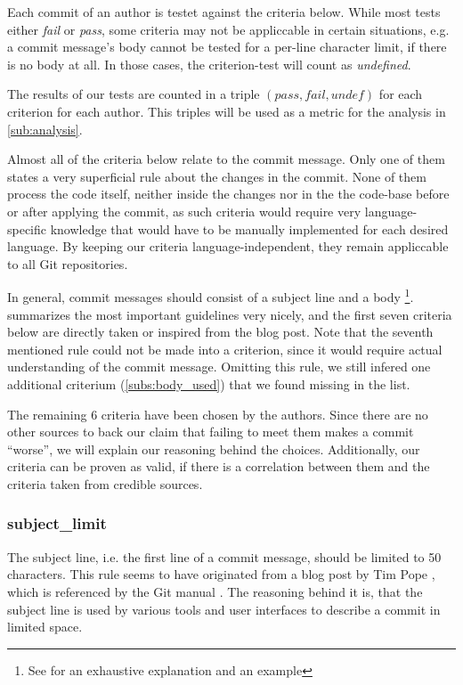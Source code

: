 
Each commit of an author is testet against the criteria below. While most tests either \emph{fail} or \emph{pass}, some criteria may not be appliccable in certain situations, e.g. a commit message's body cannot be tested for a per-line character limit, if there is no body at all. In those cases, the criterion-test will count as \emph{undefined}.

The results of our tests are counted in a triple $(pass, fail, undef)$ for each criterion for each author. This triples will be used as a metric for the analysis in \ref{sub:analysis}.

Almost all of the criteria below relate to the commit message. Only one of them states a very superficial rule about the changes in the commit. None of them process the code itself, neither inside the changes nor in the the code-base before or after applying the commit, as such criteria would require very language-specific knowledge that would have to be manually implemented for each desired language. By keeping our criteria language-independent, they remain appliccable to all Git repositories.

In general, commit messages should consist of a subject line and a body \footnote{See \cite{OffGuide} for an exhaustive explanation and an example}. \cite{CB} summarizes the most important guidelines very nicely, and the first seven criteria below are directly taken or inspired from the blog post. Note that the seventh mentioned rule could not be made into a criterion, since it would require actual understanding of the commit message. Omitting this rule, we still infered one additional criterium (\ref{subs:body_used}) that we found missing in the list.

The remaining 6 criteria have been chosen by the authors. Since there are no other sources to back our claim that failing to meet them makes a commit ``worse'', we will explain our reasoning behind the choices. Additionally, our criteria can be proven as valid, if there is a correlation between them and the criteria taken from credible sources. %

\subsubsection{subject\_limit}
\label{subs:subject_limit}
The subject line, i.e. the first line of a commit message, should be limited to 50 characters. This rule seems to have originated from a blog post by Tim Pope \cite{TP}, which is referenced by the Git manual \cite{OffGuide}. The reasoning behind it is, that the subject line is used by various tools and user interfaces to describe a commit in limited space.

